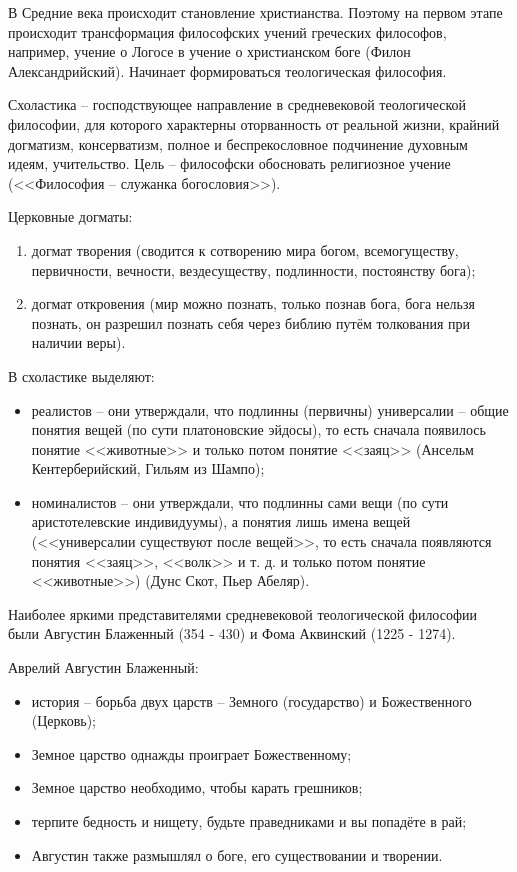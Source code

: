 
В Средние века происходит становление христианства. Поэтому на первом этапе происходит трансформация философских учений греческих философов, например, учение о Логосе в учение о христианском боге (Филон Александрийский). Начинает формироваться теологическая философия.

Схоластика -- господствующее направление в средневековой теологической философии, для которого характерны оторванность от реальной жизни, крайний догматизм, консерватизм, полное и беспрекословное подчинение духовным идеям, учительство. Цель -- философски обосновать религиозное учение (<<Философия -- служанка богословия>>).

Церковные догматы:
\begin{enumerate}
	\itemsep-1ex
	\item догмат творения (сводится к сотворению мира богом, всемогуществу, первичности, вечности, вездесуществу, подлинности, постоянству бога);
	\item догмат откровения (мир можно познать, только познав бога, бога нельзя познать, он разрешил познать себя через библию путём толкования при наличии веры).
\end{enumerate}

В схоластике выделяют:
\begin{itemize}
	\itemsep-1ex
	\item реалистов -- они утверждали, что подлинны (первичны) универсалии -- общие понятия вещей (по сути платоновские эйдосы), то есть сначала появилось понятие <<животные>> и только потом понятие <<заяц>> (Ансельм Кентерберийский, Гильям из Шампо);
	\item номиналистов -- они утверждали, что подлинны сами вещи (по сути аристотелевские индивидуумы), а понятия лишь имена вещей (<<универсалии существуют после вещей>>, то есть сначала появляются понятия <<заяц>>, <<волк>> и т. д. и только потом понятие <<животные>>) (Дунс Скот, Пьер Абеляр).
\end{itemize}

Наиболее яркими представителями средневековой теологической философии были Августин Блаженный (354 - 430) и Фома Аквинский (1225 - 1274).

Аврелий Августин Блаженный:
\begin{itemize}
	\itemsep-1ex
	\item история -- борьба двух царств -- Земного (государство) и Божественного (Церковь);
	\item Земное царство однажды проиграет Божественному;
	\item Земное царство необходимо, чтобы карать грешников;
	\item терпите бедность и нищету, будьте праведниками и вы попадёте в рай;
	\item Августин также размышлял о боге, его существовании и творении.
\end{itemize}

